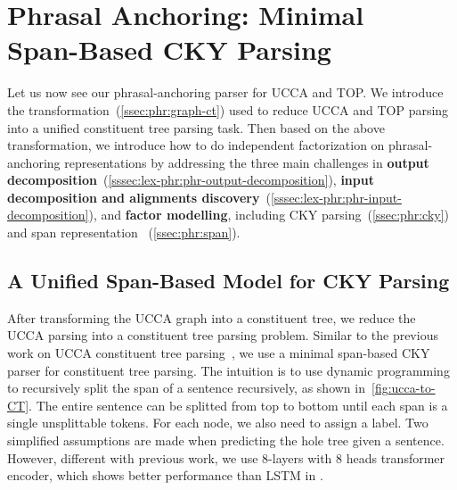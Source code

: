 \section[Phrasal Anchoring: Minimal Span-Based CKY Parsing]{Phrasal Anchoring: Minimal \\Span-Based CKY Parsing}
\label{sec:lex-phr:cky-based}

Let us now see our phrasal-anchoring parser for UCCA and TOP. We
introduce the transformation~(\autoref{ssec:phr:graph-ct}) used to
reduce UCCA and TOP parsing into a unified constituent tree parsing
task. Then based on the above transformation, we introduce how to do
independent factorization on phrasal-anchoring representations by addressing the three
main challenges in \textbf{output
  decomposition}~(\autoref{sssec:lex-phr:phr-output-decomposition}),
\textbf{input decomposition and alignments
  discovery}~(\autoref{sssec:lex-phr:phr-input-decomposition}), and
\textbf{factor modelling}, including CKY
parsing~(\autoref{ssec:phr:cky}) and span representation
~(\autoref{ssec:phr:span}).





\subsection{A Unified Span-Based Model for CKY Parsing}
\label{ssec:phr:cky}
After transforming the UCCA graph into a constituent tree, we reduce
the UCCA parsing into a constituent tree parsing problem. Similar to
the previous work on UCCA constituent tree
parsing~\cite{jiang2019hlt}, we use a minimal span-based CKY parser
for constituent tree parsing.  The intuition is to use dynamic
programming to recursively split the span of a sentence recursively,
as shown in~\autoref{fig:ucca-to-CT}. The entire sentence can be
splitted from top to bottom until each span is a single unsplittable
tokens. For each node, we also need to assign a label. Two simplified
assumptions are made when predicting the hole tree given a
sentence. However, different with previous work, we use 8-layers with
8 heads transformer encoder, which shows better performance than LSTM
in \citet{kitaev2018constituency}.


